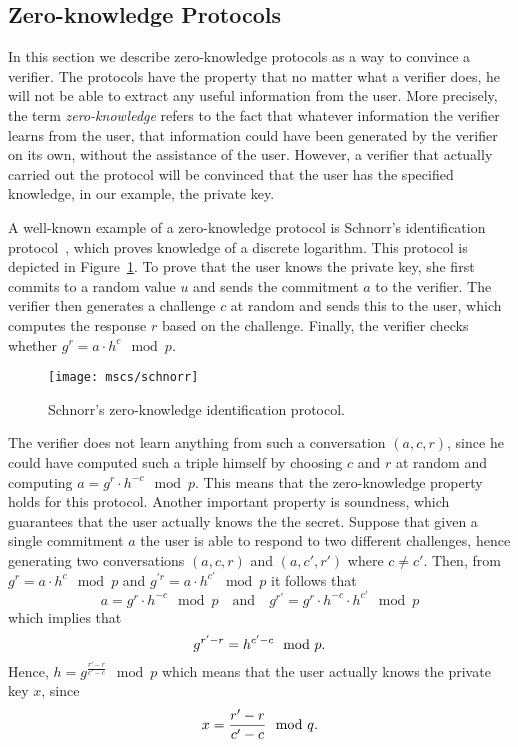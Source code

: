\subsection{Zero-knowledge Protocols}

In this section we describe zero-knowledge protocols as a way to convince a
verifier. The protocols have the property that no matter what a verifier does,
he will not be able to extract any useful information from the user. More
precisely, the term \emph{zero-knowledge} refers to the fact that whatever
information the verifier learns from the user, that information could have been
generated by the verifier on its own, without the assistance of the user.
However, a verifier that actually carried out the protocol will be convinced
that the user has the specified knowledge, in our example, the private key.

A well-known example of a zero-knowledge protocol is Schnorr's identification
protocol~\cite{Schnorr1991}, which proves knowledge of a discrete logarithm.
This protocol is depicted in Figure~\ref{msc:schnorr}. To prove that the user
knows the private key, she first commits to a random value $u$ and sends the
commitment $a$ to the verifier. The verifier then generates a challenge $c$ at
random and sends this to the user, which computes the response $r$ based on the
challenge. Finally, the verifier checks whether $g^r = a \cdot h^c \mod p$.

\begin{figure}[t]
  \centering
  \texttt{[image: mscs/schnorr]}
  \caption{Schnorr's zero-knowledge identification protocol.}
  \label{msc:schnorr}
\end{figure}


The verifier does not learn anything from such a conversation $(a, c, r)$, since
he could have computed such a triple himself by choosing $c$ and $r$ at random
and computing $a = g^r \cdot h^{-c} \mod p$. This means that the zero-knowledge
property holds for this protocol. Another important property is soundness, which
guarantees that the user actually knows the the secret. Suppose that given a
single commitment $a$ the user is able to respond to two different challenges,
hence generating two conversations $(a, c, r)$ and $(a, c', r')$ where
$c \neq c'$. Then, from $g^r = a \cdot h^c \mod p$ and
$g^{'r} = a \cdot h^{c'} \mod p$ it follows that
\begin{equation*}
  a = g^r \cdot h^{-c} \mod p
  \quad\text{and}\quad
  g^{r'} = g^r \cdot h^{-c} \cdot h^{c'} \mod p
\end{equation*}
which implies that
\begin{equation*}
  g^{r'-r} = h^{c'-c} \mod p\text.
\end{equation*}
Hence, $h = g^{\frac{r'-r}{c'-c}} \mod p$ which means that the user actually
knows the private key $x$, since
\begin{equation*}
  x = \frac{r'-r}{c'-c} \mod q\text.
\end{equation*}

